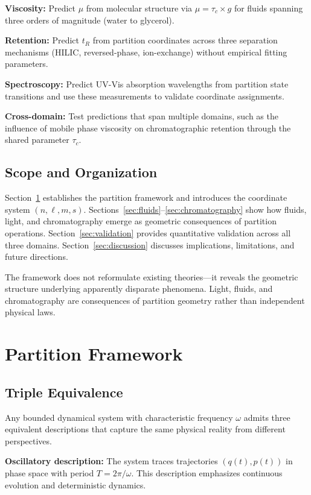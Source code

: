 \documentclass[twocolumn,superscriptaddress,prb,10pt]{revtex4-2}
\begin{document}
\textbf{Viscosity:} Predict $\mu$ from molecular structure via $\mu = \tau_c \times g$ for fluids spanning three orders of magnitude (water to glycerol).

\textbf{Retention:} Predict $t_R$ from partition coordinates across three separation mechanisms (HILIC, reversed-phase, ion-exchange) without empirical fitting parameters.

\textbf{Spectroscopy:} Predict UV-Vis absorption wavelengths from partition state transitions and use these measurements to validate coordinate assignments.

\textbf{Cross-domain:} Test predictions that span multiple domains, such as the influence of mobile phase viscosity on chromatographic retention through the shared parameter $\tau_c$.

\subsection{Scope and Organization}

Section~\ref{sec:framework} establishes the partition framework and introduces the coordinate system $(n,\ell,m,s)$. Sections~\ref{sec:fluids}--\ref{sec:chromatography} show how fluids, light, and chromatography emerge as geometric consequences of partition operations. Section~\ref{sec:validation} provides quantitative validation across all three domains. Section~\ref{sec:discussion} discusses implications, limitations, and future directions.

The framework does not reformulate existing theories—it reveals the geometric structure underlying apparently disparate phenomena. Light, fluids, and chromatography are consequences of partition geometry rather than independent physical laws.

\section{Partition Framework}
\label{sec:framework}

\subsection{Triple Equivalence}

Any bounded dynamical system with characteristic frequency $\omega$ admits three equivalent descriptions that capture the same physical reality from different perspectives.

\textbf{Oscillatory description:} The system traces trajectories $(q(t), p(t))$ in phase space with period $T = 2\pi/\omega$. This description emphasizes continuous evolution and deterministic dynamics.
\end{document}
